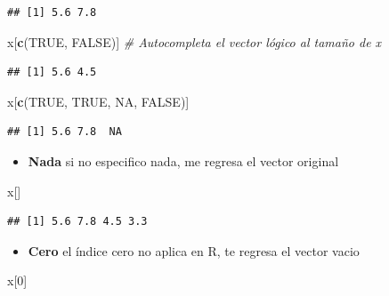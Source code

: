 \documentclass[]{article}
\newenvironment{Shaded}{\begin{snugshade}}{\end{snugshade}}
\newcommand{\KeywordTok}[1]{\textcolor[rgb]{0.13,0.29,0.53}{\textbf{{#1}}}}
\newcommand{\DecValTok}[1]{\textcolor[rgb]{0.00,0.00,0.81}{{#1}}}
\newcommand{\CommentTok}[1]{\textcolor[rgb]{0.56,0.35,0.01}{\textit{{#1}}}}
\newcommand{\OtherTok}[1]{\textcolor[rgb]{0.56,0.35,0.01}{{#1}}}
\newcommand{\NormalTok}[1]{{#1}}
\begin{document}
\begin{verbatim}
## [1] 5.6 7.8
\end{verbatim}

\begin{Shaded}
\begin{Highlighting}[]
\NormalTok{x[}\KeywordTok{c}\NormalTok{(}\OtherTok{TRUE}\NormalTok{, }\OtherTok{FALSE}\NormalTok{)] }\CommentTok{# Autocompleta el vector lógico al tamaño de x}
\end{Highlighting}
\end{Shaded}

\begin{verbatim}
## [1] 5.6 4.5
\end{verbatim}

\begin{Shaded}
\begin{Highlighting}[]
\NormalTok{x[}\KeywordTok{c}\NormalTok{(}\OtherTok{TRUE}\NormalTok{, }\OtherTok{TRUE}\NormalTok{, }\OtherTok{NA}\NormalTok{, }\OtherTok{FALSE}\NormalTok{)]}
\end{Highlighting}
\end{Shaded}

\begin{verbatim}
## [1] 5.6 7.8  NA
\end{verbatim}

\begin{itemize}
\itemsep1pt\parskip0pt
\item
  \textbf{Nada} si no especifico nada, me regresa el vector original
\end{itemize}

\begin{Shaded}
\begin{Highlighting}[]
\NormalTok{x[]}
\end{Highlighting}
\end{Shaded}

\begin{verbatim}
## [1] 5.6 7.8 4.5 3.3
\end{verbatim}

\begin{itemize}
\itemsep1pt\parskip0pt
\item
  \textbf{Cero} el índice cero no aplica en R, te regresa el vector
  vacio
\end{itemize}

\begin{Shaded}
\begin{Highlighting}[]
\NormalTok{x[}\DecValTok{0}\NormalTok{]}
\end{Highlighting}
\end{Shaded}
\end{document}
